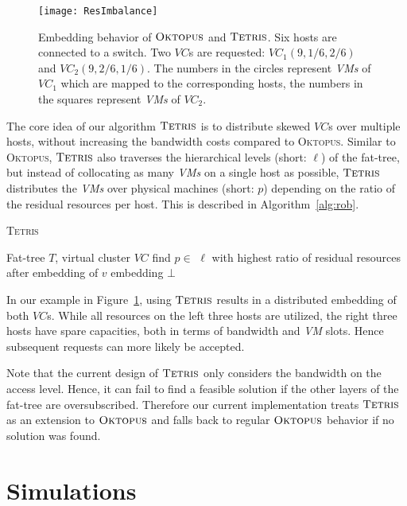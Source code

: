 \documentclass{sig-alternate-per}
\newcommand{\ALG}{\textsc{Tetris}}
\newcommand{\OKTO}{\textsc{Oktopus}}
\begin{document}
\begin{figure}[ht]
  \centering
\texttt{[image: ResImbalance]}
      \caption{Embedding behavior of $\OKTO$ and $\ALG$. Six hosts are connected to a switch. Two $VC$s are requested: $VC_1(9,1/6,2/6)$ and $VC_2(9,2/6,1/6)$. The numbers in the
circles represent \emph{VMs} of $VC_1$ which are mapped to the corresponding hosts, the numbers in the squares represent
\emph{VMs} of $VC_2$.}
      \label{fig:imbalance-pic}
  \end{figure}


The core idea of our algorithm $\ALG$ is to distribute
skewed $VC$s over multiple hosts, without increasing the bandwidth costs compared to \OKTO. Similar to \OKTO, $\ALG$
also
traverses the hierarchical levels (short: $\ell$) of the fat-tree, but instead of collocating as many \emph{VMs} on a
single host as
possible, $\ALG$ distributes the \emph{VMs} over physical machines (short: $p$) depending on the ratio of the residual
resources per host. This is described
in Algorithm~\ref{alg:rob}.

\begin{algorithm}[ht]
    \caption{\ALG}
    \label{alg:rob}
    \begin{algorithmic}[1]
    \REQUIRE Fat-tree $T$, virtual cluster $VC$
	\STATE find $p \in$ $\ell$ with highest ratio of residual resources after embedding of $v$
      \ENDFOR
	\RETURN embedding	
      \ENDIF
    \ENDFOR
    \RETURN $\bot$	
    \end{algorithmic}
\end{algorithm}

In our example in Figure~\ref{fig:imbalance-pic}, using $\ALG$
results in a distributed embedding of both
$VC$s. While all resources on the left three hosts are utilized, the right three hosts have spare capacities, both in
terms of bandwidth and \emph{VM} slots. Hence subsequent requests can more likely be accepted.

Note that the current design of $\ALG$ only considers the bandwidth on the access
level. Hence, it can fail to find a feasible solution if the other layers of the fat-tree are oversubscribed. Therefore
our current implementation treats $\ALG$ as an extension to $\OKTO$ and falls back to regular $\OKTO$ behavior if no
solution was found.

\section{Simulations}\label{sec:simulations}
\end{document}
